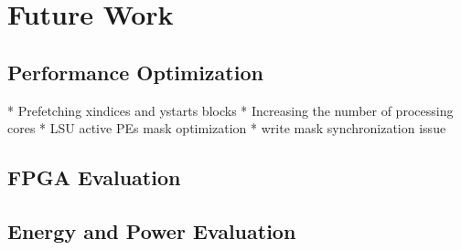 \section{Future Work}

\subsection{Performance Optimization}
* Prefetching xindices and ystarts blocks
* Increasing the number of processing cores
* LSU active PEs mask optimization
* write mask synchronization issue

\subsection{FPGA Evaluation}

\subsection{Energy and Power Evaluation}